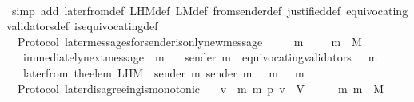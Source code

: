 \begin{isabellebody}
%
\isadelimproof
\ \ %
\endisadelimproof
%
\isatagproof
{}\isamarkupfalse%
\ {\isacharparenleft}simp\ add{\isacharcolon}\ later{\isacharunderscore}from{\isacharunderscore}def\ L{\isacharunderscore}H{\isacharunderscore}M{\isacharunderscore}def\ L{\isacharunderscore}M{\isacharunderscore}def\ from{\isacharunderscore}sender{\isacharunderscore}def\ justified{\isacharunderscore}def\ equivocating{\isacharunderscore}validators{\isacharunderscore}def\ is{\isacharunderscore}equivocating{\isacharunderscore}def{\isacharparenright}\ \isanewline
\ \ \isamarkupfalse%
%
\endisatagproof
{\isafoldproof}%
%
\isadelimproof
\isanewline
%
\endisadelimproof
\isanewline
\isanewline
{}\isamarkupfalse%
\ {\isacharparenleft}\ Protocol{\isacharparenright}\ later{\isacharunderscore}messages{\isacharunderscore}for{\isacharunderscore}sender{\isacharunderscore}is{\isacharunderscore}only{\isacharunderscore}new{\isacharunderscore}message\ {\isacharcolon}\isanewline
\ \ {\isachardoublequoteopen}{\isasymforall}\ {\isasymsigma}\ m{\isachardot}\ {\isasymsigma}\ {\isasymin}\ {\isasymSigma}\ {\isasymand}\ m\ {\isasymin}\ M\ \isanewline
\ \ {\isasymlongrightarrow}\ immediately{\isacharunderscore}next{\isacharunderscore}message\ {\isacharparenleft}{\isasymsigma}{\isacharcomma}\ m{\isacharparenright}\isanewline
\ \ {\isasymlongrightarrow}\ sender\ m\ {\isasymnotin}\ equivocating{\isacharunderscore}validators\ {\isacharparenleft}{\isasymsigma}\ {\isasymunion}\ {\isacharbraceleft}m{\isacharbraceright}{\isacharparenright}\isanewline
\ \ {\isasymlongrightarrow}\ later{\isacharunderscore}from\ {\isacharparenleft}the{\isacharunderscore}elem\ {\isacharparenleft}L{\isacharunderscore}H{\isacharunderscore}M\ {\isasymsigma}\ {\isacharparenleft}sender\ m{\isacharparenright}{\isacharparenright}{\isacharcomma}\ sender\ m{\isacharcomma}\ {\isasymsigma}\ {\isasymunion}\ {\isacharbraceleft}m{\isacharbraceright}{\isacharparenright}\ {\isacharequal}\ \ {\isacharbraceleft}m{\isacharbraceright}{\isachardoublequoteclose}\isanewline
%
\isadelimproof
\ \ %
\endisadelimproof
%
\isatagproof
{}\isamarkupfalse%
%
\endisatagproof
{\isafoldproof}%
%
\isadelimproof
\isanewline
%
\endisadelimproof
\isanewline
\isanewline
{}\isamarkupfalse%
\ {\isacharparenleft}\ Protocol{\isacharparenright}\ later{\isacharunderscore}disagreeing{\isacharunderscore}is{\isacharunderscore}monotonic{\isacharcolon}\isanewline
\ \ {\isachardoublequoteopen}{\isasymforall}\ v\ {\isasymsigma}\ m{}\ m{}\ p{\isachardot}\ v\ {\isasymin}\ V\ {\isasymand}\ {\isasymsigma}\ {\isasymin}\ {\isasymSigma}\ {\isasymand}\ {\isacharbraceleft}m{}{\isacharcomma}\ m{}{\isacharbraceright}\ {\isasymsubseteq}\ M\isanewline

\end{isabellebody}
